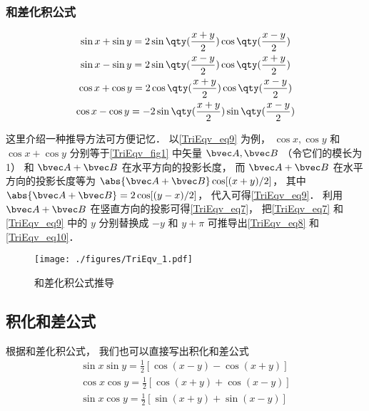 \subsubsection{和差化积公式}
\begin{gather}
\sin x + \sin y = 2\sin\qty(\frac{x + y}{2})\cos\qty(\frac{x - y}{2})\label{TriEqv_eq7}\\
\sin x - \sin y = 2\sin\qty(\frac{x - y}{2})\cos\qty(\frac{x + y}{2})\label{TriEqv_eq8}\\
\cos x + \cos y = 2\cos\qty(\frac{x+y}{2})\cos\qty(\frac{x-y}{2})\label{TriEqv_eq9}\\
\cos x - \cos y = -2\sin\qty(\frac{x+y}{2})\sin\qty(\frac{x-y}{2})\label{TriEqv_eq10}
\end{gather}

这里介绍一种推导方法可方便记忆． 以\autoref{TriEqv_eq9} 为例， $\cos x, \cos y$ 和 $\cos x + \cos y$ 分别等于\autoref{TriEqv_fig1} 中矢量 $\bvec A, \bvec B$ （令它们的模长为 1） 和 $\bvec A + \bvec B$ 在水平方向的投影长度， 而 $\bvec A + \bvec B$ 在水平方向的投影长度等为 $\abs{\bvec A + \bvec B}\cos[(x+y)/2]$， 其中 $\abs{\bvec A + \bvec B} = 2\cos [(y-x)/2]$， 代入可得\autoref{TriEqv_eq9}． 利用 $\bvec A + \bvec B$ 在竖直方向的投影可得\autoref{TriEqv_eq7}， 把\autoref{TriEqv_eq7} 和\autoref{TriEqv_eq9} 中的 $y$ 分别替换成 $-y$ 和 $y+\pi$ 可推导出\autoref{TriEqv_eq8} 和\autoref{TriEqv_eq10}．
\begin{figure}[ht]
\centering
\texttt{[image: ./figures/TriEqv\_1.pdf]}
\caption{和差化积公式推导} \label{TriEqv_fig1}
\end{figure}

\subsection{积化和差公式}
根据和差化积公式， 我们也可以直接写出积化和差公式
\begin{gather}
\sin x\sin y = \frac12 [\cos(x - y) - \cos(x + y)]\\
\cos x\cos y = \frac12 [\cos(x + y) + \cos(x - y)]\\
\sin x\cos y = \frac12 [\sin(x + y) + \sin(x - y)]
\end{gather}
